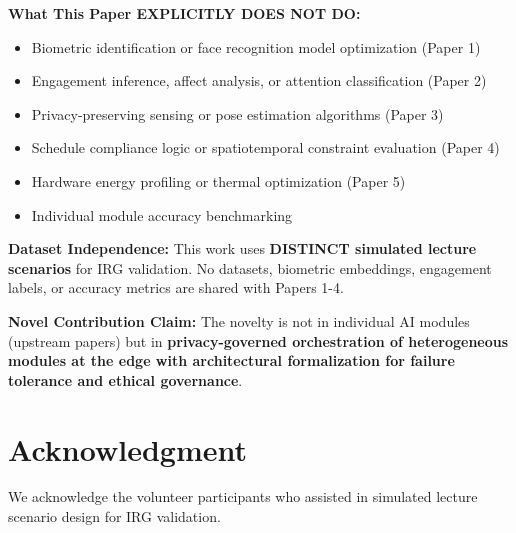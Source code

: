 \documentclass[conference]{IEEEtran}
\begin{document}
\textbf{What This Paper EXPLICITLY DOES NOT DO:}
\begin{itemize}
    \item Biometric identification or face recognition model optimization (Paper 1)
    \item Engagement inference, affect analysis, or attention classification (Paper 2)
    \item Privacy-preserving sensing or pose estimation algorithms (Paper 3)
    \item Schedule compliance logic or spatiotemporal constraint evaluation (Paper 4)
    \item Hardware energy profiling or thermal optimization (Paper 5)
    \item Individual module accuracy benchmarking
\end{itemize}

\textbf{Dataset Independence:}
This work uses \textbf{DISTINCT simulated lecture scenarios} for IRG validation. No datasets, biometric embeddings, engagement labels, or accuracy metrics are shared with Papers 1-4.

\textbf{Novel Contribution Claim:}
The novelty is not in individual AI modules (upstream papers) but in \textbf{privacy-governed orchestration of heterogeneous modules at the edge with architectural formalization for failure tolerance and ethical governance}.

\section*{Acknowledgment}
We acknowledge the volunteer participants who assisted in simulated lecture scenario design for IRG validation.
\end{document}
